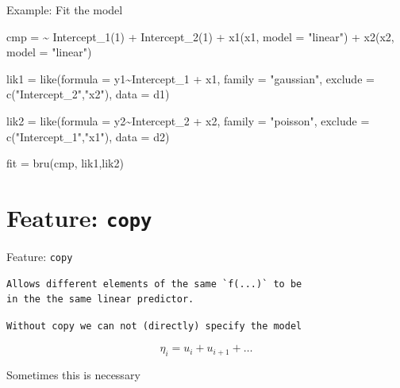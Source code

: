 \documentclass[
  ignorenonframetext,
  handout]{beamer}
\newenvironment{Shaded}{\begin{snugshade}}{\end{snugshade}}
\newcommand{\AttributeTok}[1]{\textcolor[rgb]{0.77,0.63,0.00}{#1}}
\newcommand{\DecValTok}[1]{\textcolor[rgb]{0.00,0.00,0.81}{#1}}
\newcommand{\ErrorTok}[1]{\textcolor[rgb]{0.64,0.00,0.00}{\textbf{#1}}}
\newcommand{\FunctionTok}[1]{\textcolor[rgb]{0.00,0.00,0.00}{#1}}
\newcommand{\NormalTok}[1]{#1}
\newcommand{\OtherTok}[1]{\textcolor[rgb]{0.56,0.35,0.01}{#1}}
\newcommand{\SpecialCharTok}[1]{\textcolor[rgb]{0.00,0.00,0.00}{#1}}
\newcommand{\StringTok}[1]{\textcolor[rgb]{0.31,0.60,0.02}{#1}}
\begin{document}
\begin{frame}[fragile]{Example: Fit the model}
\protect\hypertarget{example-fit-the-model-1}{}
\begin{Shaded}
\begin{Highlighting}[]
\NormalTok{cmp }\OtherTok{=} \ErrorTok{\textasciitilde{}} \FunctionTok{Intercept\_1}\NormalTok{(}\DecValTok{1}\NormalTok{) }\SpecialCharTok{+} \FunctionTok{Intercept\_2}\NormalTok{(}\DecValTok{1}\NormalTok{) }\SpecialCharTok{+}
  \FunctionTok{x1}\NormalTok{(x1, }\AttributeTok{model =} \StringTok{"linear"}\NormalTok{) }\SpecialCharTok{+} \FunctionTok{x2}\NormalTok{(x2, }\AttributeTok{model =} \StringTok{"linear"}\NormalTok{)}

\NormalTok{lik1 }\OtherTok{=} \FunctionTok{like}\NormalTok{(}\AttributeTok{formula =}\NormalTok{ y1}\SpecialCharTok{\textasciitilde{}}\NormalTok{Intercept\_1 }\SpecialCharTok{+}\NormalTok{ x1,}
            \AttributeTok{family =} \StringTok{"gaussian"}\NormalTok{,}
            \AttributeTok{exclude =} \FunctionTok{c}\NormalTok{(}\StringTok{"Intercept\_2"}\NormalTok{,}\StringTok{"x2"}\NormalTok{),}
            \AttributeTok{data =}\NormalTok{ d1)}

\NormalTok{lik2 }\OtherTok{=} \FunctionTok{like}\NormalTok{(}\AttributeTok{formula =}\NormalTok{ y2}\SpecialCharTok{\textasciitilde{}}\NormalTok{Intercept\_2 }\SpecialCharTok{+}\NormalTok{ x2,}
            \AttributeTok{family =} \StringTok{"poisson"}\NormalTok{,}
            \AttributeTok{exclude =} \FunctionTok{c}\NormalTok{(}\StringTok{"Intercept\_1"}\NormalTok{,}\StringTok{"x1"}\NormalTok{),}
            \AttributeTok{data =}\NormalTok{ d2)}

\NormalTok{fit }\OtherTok{=} \FunctionTok{bru}\NormalTok{(cmp, lik1,lik2)}
\end{Highlighting}
\end{Shaded}
\end{frame}

\hypertarget{feature-copy}{%
\section{\texorpdfstring{Feature:
\texttt{copy}}{Feature: copy}}\label{feature-copy}}

\begin{frame}[fragile]{Feature: \texttt{copy}}
\protect\hypertarget{feature-copy-1}{}
\begin{verbatim}
Allows different elements of the same `f(...)` to be
in the the same linear predictor.
\end{verbatim}

\hfill\break

\begin{verbatim}
Without copy we can not (directly) specify the model
\end{verbatim}

\[
        \eta_i = u_i + u_{i+1} + \dots
\]

\hfill\break
Sometimes this is necessary
\end{frame}
\end{document}
